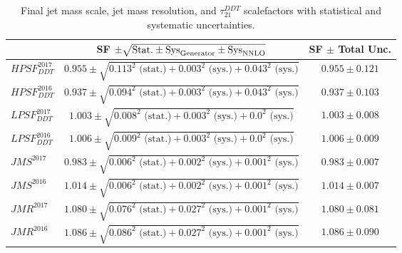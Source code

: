  \begin{table}[htbp]
    \centering
     \begin{tabular}{|l|c|c|}
     \hline
      & SF $\pm \sqrt{\textrm{Stat.} \pm \textrm{Sys}_{\rm{Generator}} \pm \textrm{Sys}_{\rm{NNLO}}}$ & SF $\pm$ Total Unc. \\
    \hline
    $HPSF_{DDT}^{2017}$ &  $0.955 \pm \sqrt{0.113^2 \textrm{ (stat.)} + 0.003^2 \textrm{ (sys.)} + 0.043^2 \textrm{ (sys.)}}$  & $0.955 \pm 0.121$\\
    $HPSF_{DDT}^{2016}$ &  $0.937 \pm \sqrt{0.094^2 \textrm{ (stat.)} + 0.003^2 \textrm{ (sys.)} + 0.043^2 \textrm{ (sys.)}}$  & $0.937 \pm 0.103$\\
  \hline
    $LPSF_{DDT}^{2017}$ &  $1.003 \pm \sqrt{0.008^2 \textrm{ (stat.)} + 0.003^2 \textrm{ (sys.)} + 0.0^2 \textrm{ (sys.)}}$  & $1.003 \pm 0.008$\\
    $LPSF_{DDT}^{2016}$ &  $1.006 \pm \sqrt{0.009^2 \textrm{ (stat.)} + 0.003^2 \textrm{ (sys.)} + 0.0^2 \textrm{ (sys.)}}$  & $1.006 \pm 0.009$\\
     \hline
    $JMS^{2017}     $ &  $0.983 \pm \sqrt{0.006^2 \textrm{ (stat.)} + 0.002^2 \textrm{ (sys.)} + 0.001^2 \textrm{ (sys.)}}$ & $0.983 \pm 0.007$\\
    $JMS^{2016}     $ &  $1.014 \pm \sqrt{0.006^2 \textrm{ (stat.)} + 0.002^2 \textrm{ (sys.)} + 0.001^2 \textrm{ (sys.)}}$ & $1.014 \pm 0.007$\\
    \hline
    $JMR^{2017}     $ &  $1.080 \pm \sqrt{0.076^2 \textrm{ (stat.)} + 0.027^2 \textrm{ (sys.)} + 0.001^2 \textrm{ (sys.)}}$ & $1.080 \pm 0.081$\\
    $JMR^{2016}     $ &  $1.086 \pm \sqrt{0.086^2 \textrm{ (stat.)} + 0.027^2 \textrm{ (sys.)} + 0.001^2 \textrm{ (sys.)}}$ & $1.086 \pm 0.090$\\
    \hline
    \end{tabular}
       \caption{Final jet mass scale, jet mass resolution, and $\tau_{21}^{DDT}$ scalefactors with statistical and systematic uncertainties.}
       \label{tab:wsf_total}
    \end{table}



